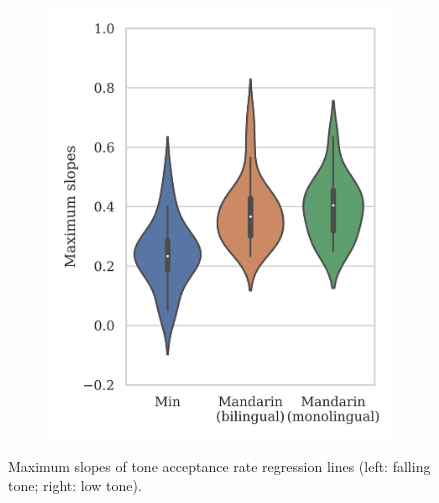 \begin{figure}[hbt!]
\begin{subfigure}[b]{.49\textwidth}
\includegraphics[width=\textwidth]{figures/E3/Result_21.png}
\end{subfigure}

\caption{Maximum slopes of tone acceptance rate regression lines (left: falling tone; right: low tone).}
\label{Figure:E3BoxPlot}
\end{figure}

